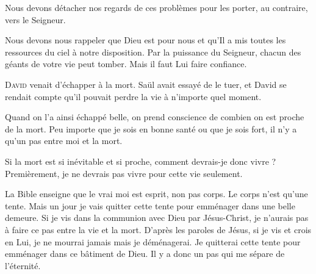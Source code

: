 
Nous devons détacher nos regards de ces problèmes pour les porter,
 au contraire, vers le Seigneur.

Nous devons nous rappeler que Dieu est pour nous et qu'Il a mis
 toutes les ressources du ciel à notre disposition.
 Par la puissance du Seigneur, chacun des géants de votre vie peut tomber.
 Mais il faut Lui faire confiance. 

\dvrule







\lettrine{D}{avid} venait d'échapper à la mort.
 Saül avait essayé de le tuer, et David se rendait compte
 qu'il pouvait perdre la vie à n'importe quel moment.

Quand on l'a ainsi échappé belle, on prend conscience de combien
 on est proche de la mort.
 Peu importe que je sois en bonne santé ou que je sois fort,
 il n'y a qu'un pas entre moi et la mort.

Si la mort est si inévitable et si proche, comment devrais-je donc vivre ?
 Premièrement, je ne devrais pas vivre pour cette vie seulement.


La Bible enseigne que le vrai moi est esprit, non pas corps.
 Le corps n'est qu'une tente. Mais un jour je vais quitter cette tente
 pour emménager dans une belle demeure.
 Si je vis dans la communion avec Dieu par Jésus-Christ,
 je n'aurais pas à faire ce pas entre la vie et la mort.
 D'après les paroles de Jésus, si je vis et crois en Lui, je ne mourrai jamais
 \ocadr mais je déménagerai.
 Je quitterai cette tente pour emménager dans ce bâtiment de Dieu.
 Il y a donc un pas qui me sépare de l'éternité.

